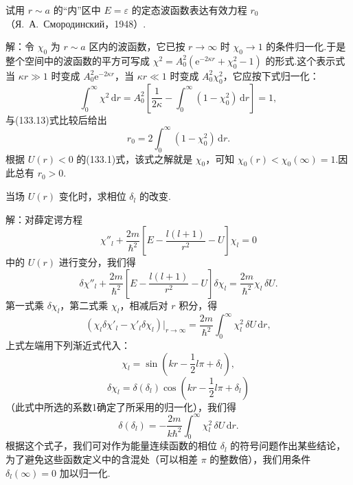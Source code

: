 \begin{xiti}

\quad 试用 $r\sim a$ 的“内”区中 $E=\varepsilon$ 的定态波函数表达有效力程 $r_0$（Я.~А.~Смородинский，1948）.

解：令 $\chi_0$ 为 $r\sim a$ 区内的波函数，它已按 $r\to\infty$ 时 $\chi_0\to1$ 的条件归一化.于是整个空间中的波函数的平方可写成
$\chi^2=A_0^2(\mathrm{e}^{-2\kappa r}+\chi_0^2-1)$ 的形式.这个表示式当 $\kappa r\gg1$ 时变成 $A_0^2\mathrm{e}^{-2\kappa r}$，当 $\kappa r\ll1$ 时变成 $A_0^2\chi_0^2$，它应按下式归一化：
\begin{equation*}
  \int_0^{\infty}\chi^2\,\mathrm{d}r
  =A_0^2\left[\frac{1}{2\kappa}
  -\int_0^{\infty}(1-\chi_0^2)\,\mathrm{d}r\right]=1,
\end{equation*}
与(133.13)式比较后给出
\begin{equation*}
  r_0=2\int_0^{\infty}(1-\chi_0^2)\,\mathrm{d}r.
\end{equation*}
根据 $U(r)<0$ 的(133.1)式，该式之解就是 $\chi_0$，可知
$\chi_0(r)<\chi_0(\infty)=1$.因此总有 $r_0>0$.

\quad 当场 $U(r)$ 变化时，求相位 $\delta_l$ 的改变.

解：对薛定谔方程
\begin{equation*}
  \chi''_l+\frac{2m}{\hbar^2}
  \left[E-\frac{l(l+1)}{r^2}-U\right]\chi_l=0
\end{equation*}
中的 $U(r)$ 进行变分，我们得
\begin{equation*}
  \delta\chi''_l+\frac{2m}{\hbar^2}
  \left[E-\frac{l(l+1)}{r^2}-U\right]\delta\chi_l
  =\frac{2m}{\hbar^2}\chi_l\,\delta U.
\end{equation*}
第一式乘 $\delta\chi_l$，第二式乘 $\chi_l$，相减后对 $r$ 积分，得
\begin{equation*}
  \left(\chi_l\delta\chi'_l-\chi'_l\delta\chi_l\right)
  \big|_{r\to\infty}
  =\frac{2m}{\hbar^2}\int_0^{\infty}\chi_l^2\,\delta U\,\mathrm{d}r,
\end{equation*}
上式左端用下列渐近式代入：
\begin{equation*}
  \chi_l=\sin\left(kr-\frac{1}{2}l\pi+\delta_l\right),
\end{equation*}
\begin{equation*}
  \delta\chi_l=\delta(\delta_l)
  \cos\left(kr-\frac{1}{2}l\pi+\delta_l\right)
\end{equation*}
（此式中所选的系数1确定了所采用的归一化），我们得
\begin{equation*}
  \delta(\delta_l)=-\frac{2m}{k\hbar^2}
  \int_0^{\infty}\chi_l^2\,\delta U\,\mathrm{d}r.
\end{equation*}
根据这个式子，我们可对作为能量连续函数的相位 $\delta_l$ 的符号问题作出某些结论，为了避免这些函数定义中的含混处（可以相差 $\pi$ 的整数倍），我们用条件 $\delta_l(\infty)=0$ 加以归一化.


\end{xiti}
